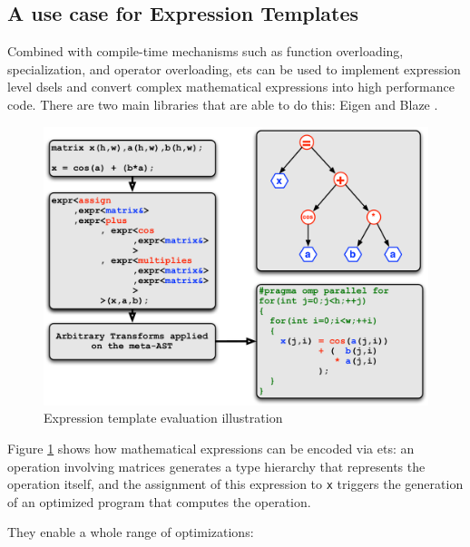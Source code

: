 \documentclass[../main]{subfiles}
\begin{document}

\subsection{
  A use case for Expression Templates
}

Combined with compile-time mechanisms such as function overloading,
specialization, and operator overloading, \glspl{et} can be used to
implement expression level \glspl{dsel} and convert complex
mathematical expressions into high performance code\cite{veldhuizen:1995}.
There are two main libraries that are able to do this: Eigen \cite{eigen}
and Blaze \cite{blazelib}.

\begin{figure}[h]
\includegraphics[width=\textwidth]{images/expressiontemplates.pdf}
\caption{
  Expression template evaluation illustration\cite{falcou-hdr}
}
\label{fig:expression-template-illustration}
\end{figure}

Figure \ref{fig:expression-template-illustration} shows how mathematical
expressions can be encoded via \glspl{et}: an operation involving matrices
generates a type hierarchy that represents the operation itself,
and the assignment of this expression to \lstinline{x} triggers the generation
of an optimized program that computes the operation.

They enable a whole range of optimizations:
\end{document}
